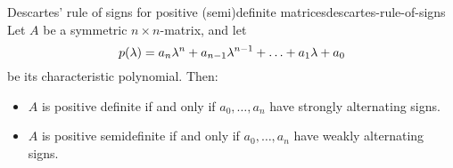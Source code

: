 \begin{proposition}{Descartes' rule of signs for positive (semi)definite matrices}{descartes-rule-of-signs}
  Let $A$ be a symmetric $n\times n$-matrix, and let
  \begin{equation*}
    p(\lambda) = a_n\lambda^n + a_{n-1}\lambda^{n-1} + \ldots + a_1\lambda + a_0
  \end{equation*}
  be its characteristic polynomial. Then:
  \begin{itemize}
  \item $A$ is positive definite if and only if $a_0,\ldots,a_n$ have
    strongly alternating signs.
  \item $A$ is positive semidefinite if and only if $a_0,\ldots,a_n$
    have weakly alternating signs.
  \end{itemize}
\end{proposition}

